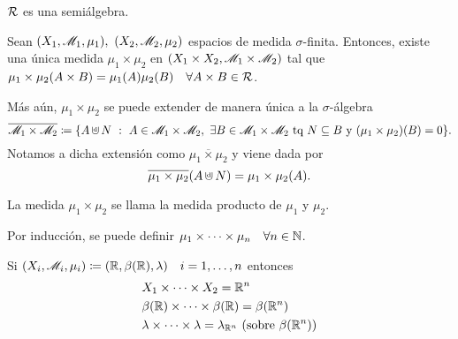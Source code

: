 \begin{remark}
	$\mathcal{R}$ es una semiálgebra.
\end{remark}

\begin{theorem}
	Sean $(X_{1}, \mscr{M}_{1}, \mu_{1}),\ (X_{2}, \mscr{M}_{2}, \mu_{2})$ espacios de medida $\sigma$-finita. Entonces, existe una única medida $\mu_{1} \times \mu_{2}$ en $(X_{1} \times X_{2}, \mathscr{M}_{1} \times \mathscr{M}_{2})$ tal que $\mu_{1} \times \mu_{2} (A \times B) = \mu_{1}(A) \mu_{2}(B) \quad \forall A \times B \in \mathcal{R}$. \par
	Más aún, $\mu_{1} \times \mu_{2}$ se puede extender de manera única a la $\sigma$-álgebra 
	\[ \overline{\mscr{M}_{1} \times \mscr{M}_{2}} \coloneq \{A \cupd N \ : \ A \in \mscr{M}_{1} \times \mscr{M}_{2},\ \exists B \in \mscr{M}_{1} \times \mscr{M}_{2} \text{ tq } N \subseteq B \text{ y } (\mu_{1} \times \mu_{2})(B) = 0\}. \]
	Notamos a dicha extensión como $\overline{\mu_{1} \times \mu_{2}}$ y viene dada por
	\[ \overline{\mu_{1} \times \mu_{2}}(A \cupd N) = \mu_{1} \times \mu_{2}(A). \]
\end{theorem}

\begin{note}
	La medida $\mu_{1} \times \mu_{2}$ se llama la medida producto de $\mu_{1}$ y $\mu_{2}$.
\end{note}

\begin{remark}
	Por inducción, se puede definir $\mu_{1} \times \cdots \times \mu_{n} \quad \forall n \in \mathbb{N}$.
\end{remark}

\begin{eg}
	Si $(X_{i}, \mathscr{M}_{i}, \mu_{i}) \coloneq (\mathbb{R}, \beta(\mathbb{R}), \lambda) \quad i = 1,\dots,n$ entonces
	\begin{align*}
		& X_{1} \times \cdots \times X_{2} = \R^n \\
		& \beta(\R) \times \cdots \times \beta(\R) = \beta(\R^n) \\
		& \lambda \times \cdots \times \lambda = \lambda_{\R^n} \ (\text{sobre } \beta(\R^n))
	\end{align*}
\end{eg}
